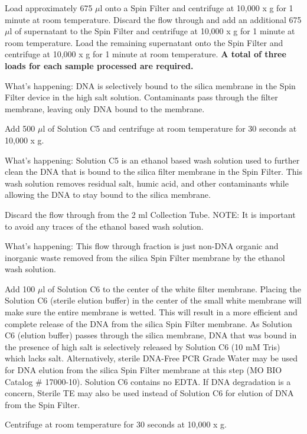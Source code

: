\documentclass[12pt]{../SOP4_alpha}\usepackage[]{graphicx}\usepackage[]{xcolor}
\begin{document}
\NP Load approximately 675 $\mu$l onto a Spin Filter and centrifuge at 10,000 x g for 1 minute at room temperature. Discard the flow through and add an additional 675 $\mu$l of supernatant to the Spin Filter and centrifuge at 10,000 x g for 1 minute at room temperature. Load the remaining supernatant onto the Spin Filter and centrifuge at 10,000 x g for 1 minute at room temperature. \textbf{A total of three loads for each sample processed are required.}

\noindent What's happening: DNA is selectively bound to the silica membrane in the Spin Filter device in the high salt solution. Contaminants pass through the
filter membrane, leaving only DNA bound to the membrane.

\NP Add 500 $\mu$l of Solution C5 and centrifuge at room temperature for 30 seconds at 10,000 x g.

\noindent What's happening: Solution C5 is an ethanol based wash solution used to further clean the DNA that is bound to the silica filter membrane in the Spin Filter. This wash solution removes residual salt, humic acid, and other contaminants while allowing the DNA to stay bound to the silica membrane.

\NP Discard the flow through from the 2 ml Collection Tube. NOTE: It is important to avoid any traces of the ethanol based wash solution.

\noindent What's happening: This flow through fraction is just non-DNA organic and inorganic waste removed from the silica Spin Filter membrane by the ethanol wash solution.


\NP Add 100 $\mu$l of Solution C6 to the center of the white filter membrane. Placing the Solution C6 (sterile elution buffer) in the center of the small white membrane will make sure the entire membrane is wetted. This will result in a more efficient and complete release of the DNA from the silica Spin Filter membrane. As Solution C6 (elution buffer) passes through the silica membrane, DNA that was bound in the presence of high salt is selectively released by Solution C6 (10 mM Tris) which lacks salt. Alternatively, sterile DNA-Free PCR Grade Water may be used for DNA elution from the silica Spin Filter membrane at this step (MO BIO Catalog \# 17000-10). Solution C6 contains no EDTA. If DNA degradation is a concern, Sterile TE may also be used instead of Solution C6 for elution of DNA from the Spin Filter.


\NP Centrifuge at room temperature for 30 seconds at 10,000 x g.
\end{document}
